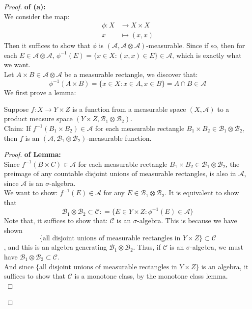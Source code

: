 \documentclass[lang=cn,11pt]{elegantbook}
\begin{document}
\begin{proof}
    \textbf{of (a):}\\
We consider the map: \begin{align}
    \phi: X &\to X \times X  \\
     x & \mapsto (x,x)
\end{align}
Then it suffices to show that $\phi$ is $(\mathcal{A},\mathcal{A}\otimes \mathcal{A})$-measurable. Since if so, then for each $E\in\mathcal{A}\otimes\mathcal{A}$, $\phi^{-1}(E)  =  \{x\in X : (x,x)\in E\}\in \mathcal{A}$, which is exactly what we want.\\
Let $A \times B \in  \mathcal{A}\otimes \mathcal{A} $ be a measurable rectangle, we discover that:
$$\phi^{-1}(A \times B)  =  \{x\in X : x \in A , x \in B\} = A \cap B \in \mathcal{A}$$
We first prove a lemma:
\begin{lemma}
    Suppose $f: X\to Y\times Z$ is a function from a measurable space $(X,\mathcal{A})$ to a product measure space $(Y\times Z, \mathcal{B}_1 \otimes \mathcal{B}_2)$.\\
  Claim: If $f^{-1}(B_1\times B_2)\in\mathcal{A}$ for each measurable rectangle $B_1 \times B_2 \in \mathcal{B}_1 \otimes \mathcal{B}_2$, then $f$ is an $(\mathcal{A}, \mathcal{B}_1 \otimes \mathcal{B}_2)$-measurable function.
\end{lemma}
\begin{proof}
    \textbf{of Lemma:}\\
     Since $f^{-1}(B\times C) \in \mathcal{A}$ for each measurable rectangle $B_1 \times B_2 \in \mathcal{B}_1 \otimes \mathcal{B}_2$, the preimage of any countable disjoint unions of measurable rectangles, is also in $\mathcal{A}$, since $\mathcal{A}$ is an $\sigma$-algebra.\\
     We want to show: $f^{-1}(E) \in\mathcal{A}$ for any $E \in  \mathcal{B}_1 \otimes \mathcal{B}_2$. It is equivalent to show that \[
\mathcal{B}_1 \otimes \mathcal{B}_2 \subset   \mathcal{C} : = \{ E \in Y\times Z  : \phi^{-1} (E) \in \mathcal{A}        \}
\]
Note that, it suffices to show that: $\mathcal{C}$ is an $\sigma$-algebra. This is because we have shown $$\{\text{all disjoint unions of measurable rectangles in }   Y\times Z\} \subset \mathcal{C}$$, and this is an algebra generating $\mathcal{B}_1 \otimes \mathcal{B}_2$. Thus, if $\mathcal{C}$ is an $\sigma$-algebra, we must have \(
   \mathcal{B}_1 \otimes \mathcal{B}_2 \subset \mathcal{C}
   \). \\
   And since $\{\text{all disjoint unions of measurable rectangles in }   Y\times Z\}$ is an algebra, it suffices to show that $\mathcal{C}$ is a monotone class, by the monotone class lemma.\\
   

\end{proof}
\end{proof}
\end{document}
